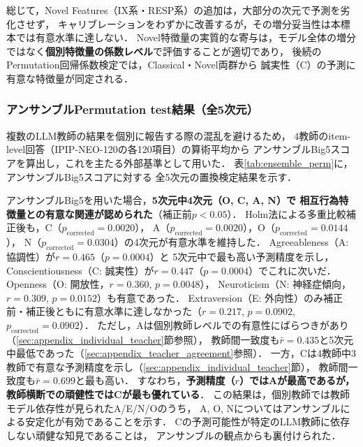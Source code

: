 \documentclass[dvipdfmx,11pt,a4paper]{bxjsarticle}
\begin{document}
総じて，Novel Features（IX系・RESP系）の追加は，大部分の次元で予測を劣化させず，
キャリブレーションをわずかに改善するが，その増分妥当性は本標本では有意水準に達しない．
Novel特徴量の実質的な寄与は，モデル全体の増分ではなく\textbf{個別特徴量の係数レベル}で評価することが適切であり，
後続のPermutation回帰係数検定では，Classical・Novel両群から
誠実性（C）の予測に有意な特徴量が同定される．

\subsubsection{アンサンブルPermutation test結果（全5次元）}
\label{sec:result_ensemble}

複数のLLM教師の結果を個別に報告する際の混乱を避けるため，
4教師のitem-level回答（IPIP-NEO-120の各120項目）の算術平均から
アンサンブルBig5スコアを算出し，これを主たる外部基準として用いた．
表\ref{tab:ensemble_perm}に，アンサンブルBig5スコアに対する
全5次元の置換検定結果を示す．

\begin{table}[htbp]
\centering
\caption{アンサンブルBig5に対する置換検定結果（全5次元）．
観測相関係数$r_{\text{obs}}$，補正前$p$値，およびHolm法による補正後$p$値を示す．太字は補正後$p < 0.05$．}
\label{tab:ensemble_perm}

\end{table}

アンサンブルBig5を用いた場合，\textbf{5次元中4次元（O, C, A, N）で
相互行為特徴量との有意な関連が認められた}（補正前$p < 0.05$）．
Holm法による多重比較補正後も，C（$p_{\text{corrected}} = 0.0020$），
A（$p_{\text{corrected}} = 0.0020$），O（$p_{\text{corrected}} = 0.0144$），
N（$p_{\text{corrected}} = 0.0304$）の4次元が有意水準を維持した．
Agreeableness（A: 協調性）が$r = 0.465$（$p = 0.0004$）と
5次元中で最も高い予測精度を示し，
Conscientiousness（C: 誠実性）が$r = 0.447$（$p = 0.0004$）でこれに次いだ．
Openness（O: 開放性，$r = 0.360$, $p = 0.0048$），
Neuroticism（N: 神経症傾向，$r = 0.309$, $p = 0.0152$）も有意であった．
Extraversion（E: 外向性）のみ補正前・補正後ともに有意水準に達しなかった（$r = 0.217$, $p = 0.0902$, $p_{\text{corrected}} = 0.0902$）．
ただし，Aは個別教師レベルでの有意性にばらつきがあり（\ref{sec:appendix_individual_teacher}節参照），
教師間一致度も$\bar{r} = 0.435$と5次元中最低であった（\ref{sec:appendix_teacher_agreement}参照）．
一方，Cは4教師中3教師で有意な予測精度を示し（\ref{sec:appendix_individual_teacher}節），
教師間一致度も$\bar{r} = 0.699$と最も高い．
すなわち，\textbf{予測精度（$r$）ではAが最高であるが，
教師横断での頑健性ではCが最も優れている}．
この結果は，個別教師では教師モデル依存性が見られたA/E/N/Oのうち，
A, O, Nについてはアンサンブルによる安定化が有効であることを示す．
Cの予測可能性が特定のLLM教師に依存しない頑健な知見であることは，
アンサンブルの観点からも裏付けられた．
\end{document}
